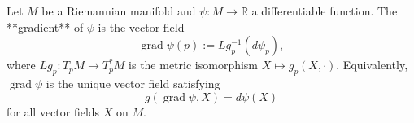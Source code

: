 Let $M$ be a Riemannian manifold and $\psi: M \to \mathbb{R}$ a differentiable function. The **gradient** of $\psi$ is the vector field
$$\operatorname{grad} \psi(p) := Lg_p^{-1}(d\psi_p),$$
where $Lg_p: T_pM \to T_p^*M$ is the metric isomorphism $X \mapsto g_p(X, \cdot)$. Equivalently, $\operatorname{grad} \psi$ is the unique vector field satisfying
$$g(\operatorname{grad} \psi, X) = d\psi(X)$$
for all vector fields $X$ on $M$.